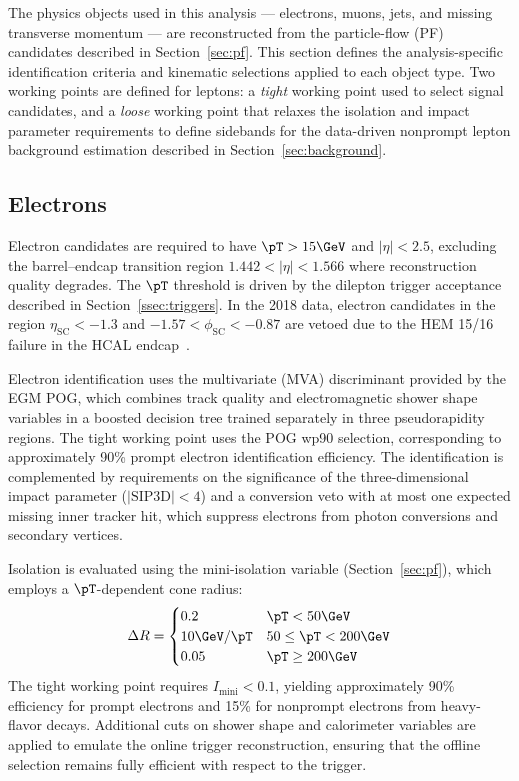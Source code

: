The physics objects used in this analysis --- electrons, muons, jets, and missing transverse momentum --- are reconstructed from the particle-flow (PF) candidates described in Section~\ref{sec:pf}. This section defines the analysis-specific identification criteria and kinematic selections applied to each object type. Two working points are defined for leptons: a \textit{tight} working point used to select signal candidates, and a \textit{loose} working point that relaxes the isolation and impact parameter requirements to define sidebands for the data-driven nonprompt lepton background estimation described in Section~\ref{sec:background}.

\subsection{Electrons}
\label{ssec:electrons}

Electron candidates are required to have $\pT > 15\GeV$ and $|\eta| < 2.5$, excluding the barrel--endcap transition region $1.442 < |\eta| < 1.566$ where reconstruction quality degrades. The $\pT$ threshold is driven by the dilepton trigger acceptance described in Section~\ref{ssec:triggers}. In the 2018 data, electron candidates in the region $\eta_\text{SC} < -1.3$ and $-1.57 < \phi_\text{SC} < -0.87$ are vetoed due to the HEM 15/16 failure in the HCAL endcap~\cite{CMS-DP-2020-015}.

Electron identification uses the multivariate (MVA) discriminant provided by the EGM POG, which combines track quality and electromagnetic shower shape variables in a boosted decision tree trained separately in three pseudorapidity regions. The tight working point uses the POG wp90 selection, corresponding to approximately 90\% prompt electron identification efficiency. The identification is complemented by requirements on the significance of the three-dimensional impact parameter ($|\text{SIP3D}| < 4$) and a conversion veto with at most one expected missing inner tracker hit, which suppress electrons from photon conversions and secondary vertices.

Isolation is evaluated using the mini-isolation variable (Section~\ref{sec:pf}), which employs a $\pT$-dependent cone radius:
\begin{equation}
\label{eq:miniiso_cone}
\Delta R = \begin{cases} 0.2 & \pT < 50\GeV \\ 10\GeV / \pT & 50 \leq \pT < 200\GeV \\ 0.05 & \pT \geq 200\GeV \end{cases}
\end{equation}
The tight working point requires $I_\text{mini} < 0.1$, yielding approximately 90\% efficiency for prompt electrons and 15\% for nonprompt electrons from heavy-flavor decays. Additional cuts on shower shape and calorimeter variables are applied to emulate the online trigger reconstruction, ensuring that the offline selection remains fully efficient with respect to the trigger.

